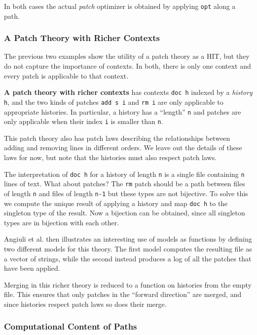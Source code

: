 In both cases the actual \emph{patch} optimizer is obtained by applying
\texttt{opt} along a path.

\subsubsection{A Patch Theory with Richer Contexts} 

The previous two examples show the utility of a patch theory as a HIT,
but they do not capture the importance of contexts. In both, there is only one
context and every patch is applicable to that context.

\textbf{A patch theory with richer contexts} has contexts \texttt{doc h} indexed by a
\emph{history} \texttt{h}, and the two kinds of patches \texttt{add s i} and
\texttt{rm i} are only applicable to appropriate histories. In particular, a
history has a ``length'' \texttt{n} and patches are only applicable when their
index \texttt{i} is smaller than \texttt{n}.

This patch theory also has patch laws describing the relationships between
adding and removing lines in different orders. We leave out the details of these
laws for now, but note that the histories must also respect patch laws.

The interpretation of \texttt{doc h} for a history of length \texttt{n} is a
single file containing \texttt{n} lines of text. What about patches? The
\texttt{rm} patch should be a path between files of length \texttt{n} and files
of length \texttt{n-1} but these types are not bijective. To solve this we
compute the unique result of applying a history and map \texttt{doc h} to the
singleton type of the result. Now a bijection can be obtained, since all
singleton types are in bijection with each other.

Angiuli et al. then illustrates an interesting use of models as functions by
defining two different models for this theory. The first model computes the
resulting file as a vector of strings, while the second instead produces a log
of all the patches that have been applied.

Merging in this richer theory is reduced to a function on histories from the
empty file. This ensures that only patches in the ``forward direction'' are
merged, and since histories respect patch laws so does their merge.

\subsubsection{Computational Content of Paths}

